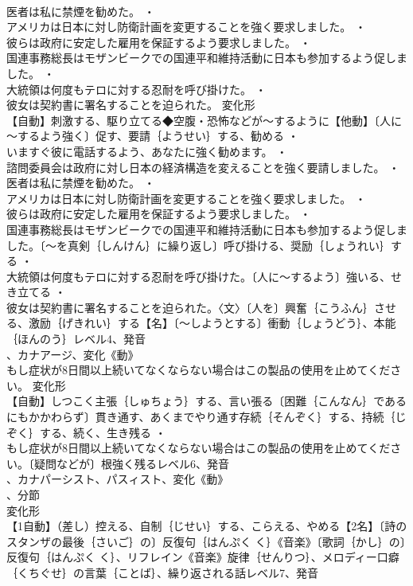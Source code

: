 \documentclass[8pt]{extreport}
\begin{document}
\begin{CJK}{UTF8}{min}
\\	医者は私に禁煙を勧めた。 ・
\\	アメリカは日本に対し防衛計画を変更することを強く要求しました。 ・
\\	彼らは政府に安定した雇用を保証するよう要求しました。 ・
\\	国連事務総長はモザンビークでの国連平和維持活動に日本も参加するよう促しました。 ・
\\	大統領は何度もテロに対する忍耐を呼び掛けた。 ・
\\	彼女は契約書に署名することを迫られた。	変化形 
\\	【自動】刺激する、駆り立てる◆空腹・恐怖などが～するように【他動】〔人に～するよう強く〕促す、要請｛ようせい｝する、勧める ・
\\	いますぐ彼に電話するよう、あなたに強く勧めます。 ・
\\	諮問委員会は政府に対し日本の経済構造を変えることを強く要請しました。 ・
\\	医者は私に禁煙を勧めた。 ・
\\	アメリカは日本に対し防衛計画を変更することを強く要求しました。 ・
\\	彼らは政府に安定した雇用を保証するよう要求しました。 ・
\\	国連事務総長はモザンビークでの国連平和維持活動に日本も参加するよう促しました。〔～を真剣｛しんけん｝に繰り返し〕呼び掛ける、奨励｛しょうれい｝する ・
\\	大統領は何度もテロに対する忍耐を呼び掛けた。〔人に～するよう〕強いる、せき立てる ・
\\	彼女は契約書に署名することを迫られた。〈文〉〔人を〕興奮｛こうふん｝させる、激励｛げきれい｝する【名】〔～しようとする〕衝動｛しょうどう｝、本能｛ほんのう｝レベル4、発音
\\	、カナアージ、変化《動》
\\	もし症状が8日間以上続いてなくならない場合はこの製品の使用を止めてください。	変化形 
\\	【自動】しつこく主張｛しゅちょう｝する、言い張る〔困難｛こんなん｝であるにもかかわらず〕貫き通す、あくまでやり通す存続｛そんぞく｝する、持続｛じぞく｝する、続く、生き残る ・
\\	もし症状が8日間以上続いてなくならない場合はこの製品の使用を止めてください。〔疑問などが〕根強く残るレベル6、発音
\\	、カナパーシスト、パスィスト、変化《動》
\\	、分節
\\	変化形 
\\	【1自動】（差し）控える、自制｛じせい｝する、こらえる、やめる【2名】〔詩のスタンザの最後｛さいご｝の〕反復句｛はんぷく く｝《音楽》〔歌詞｛かし｝の〕反復句｛はんぷく く｝、リフレイン《音楽》旋律｛せんりつ｝、メロディー口癖｛くちぐせ｝の言葉｛ことば｝、繰り返される話レベル7、発音

\end{CJK}
\end{document}

